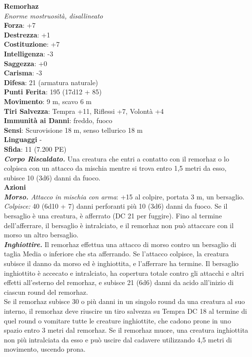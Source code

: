 \begin{multicols}{2}
\medskip\textbf{Remorhaz}\\
\emph{Enorme mostruosità, disallineato}\\
\textbf{Forza}: +7\\
\textbf{Destrezza}: +1\\
\textbf{Costituzione}: +7\\
\textbf{Intelligenza}: -3\\
\textbf{Saggezza}: +0\\
\textbf{Carisma}: -3\\
\textbf{Difesa}: 21 (armatura naturale)\\
\textbf{Punti Ferita}: 195 (17d12 + 85)\\
\textbf{Movimento}: 9 m, scavo 6 m\\
\textbf{Tiri Salvezza}: Tempra +11, Riflessi +7, Volontà +4\\
\textbf{Immunità ai Danni}: freddo, fuoco\\
\textbf{Sensi}: Scurovisione 18 m, senso tellurico 18 m\\
\textbf{Linguaggi} -\\
\textbf{Sfida}: 11 (7.200 PE)\smallskip\\
\emph{\textbf{Corpo Riscaldato.}} Una creatura che entri a contatto con il remorhaz o lo colpisca con un attacco da mischia mentre si trova entro 1,5 metri da esso, subisce 10 (3d6) danni da fuoco.\\
\smallskip\textbf{Azioni}\\
\emph{\textbf{Morso.} Attacco in mischia con arma}: +15 al colpire, portata 3 m, un bersaglio.\\
\emph{Colpisce:} 40 (6d10 + 7) danni perforanti più 10 (3d6) danni da fuoco. Se il bersaglio è una creatura, è afferrato (DC  21 per fuggire). Fino al termine dell'afferrare, il bersaglio è intralciato, e il remorhaz non può attaccare con il morso un altro bersaglio.\\
\emph{\textbf{Inghiottire.}} Il remorhaz effettua una attacco di morso contro un bersaglio di taglia Media o inferiore che sta afferrando. Se l'attacco colpisce, la creatura subisce il danno da morso ed è inghiottita, e l'afferrare ha termine. Il bersaglio inghiottito è accecato e intralciato, ha copertura totale contro gli attacchi e altri effetti all'esterno del remorhaz, e subisce 21 (6d6) danni da acido all'inizio di ciascun round del remorhaz.\\
Se il remorhaz subisce 30 o più danni in un singolo round da una creatura al suo interno, il remorhaz deve riuscire un tiro salvezza su Tempra DC  18 al termine di quel round o vomitare tutte le creature inghiottite, che cadono prone in uno spazio entro 3 metri dal remorhaz. Se il remorhaz muore, una creatura inghiottita non più intralciata da esso e può uscire dal cadavere utilizzando 4,5 metri di movimento, uscendo prona.\\

\end{multicols}
